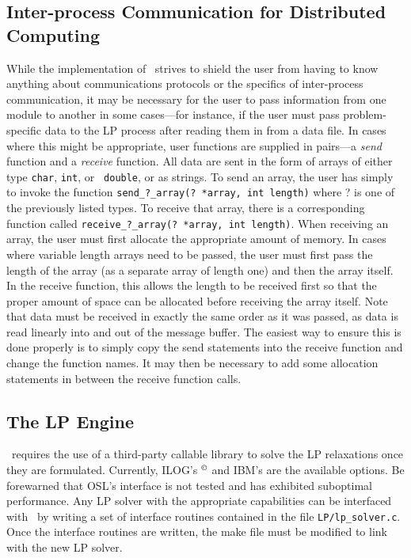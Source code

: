 \subsection{Inter-process Communication for Distributed Computing}
\label{communication}
While the implementation of \BB\ strives to shield the user from
having to know anything about communications protocols or the
specifics of inter-process communication, it may be necessary for the
user to pass information from one module to another in some
cases---for instance, if the user must pass problem-specific data to
the LP process after reading them in from a data file. In cases where
this might be appropriate, user functions are supplied in pairs---a
{\em send} function and a {\em receive} function. All data are sent in
the form of arrays of either type {\tt char}, {\tt int}, or {\tt
double}, or as strings. To send an array, the user has simply to
invoke the function {\tt send\_?\_array(? *array, int length)} where ?
is one of the previously listed types. To receive that array, there is
a corresponding function called {\tt receive\_?\_array(? *array, int
length)}. When receiving an array, the user must first
allocate the appropriate amount of memory. In cases where variable
length arrays need to be passed, the user must first pass the length
of the array (as a separate array of length one) and then the array
itself. In the receive function, this allows the length to be received
first so that the proper amount of space can be allocated before
receiving the array itself. Note that data must be received in exactly
the same order as it was passed, as data is read linearly into and out
of the message buffer. The easiest way to ensure this is done properly
is to simply copy the send statements into the receive function and
change the function names. It may then be necessary to add some
allocation statements in between the receive function calls.

\subsection{The LP Engine}

\BB\ requires the use of a third-party callable library to solve the LP 
relaxations once they are formulated. Currently, ILOG's
$^{\copyright}$
and IBM's
are the available options. Be forewarned that OSL's interface is not
tested and has exhibited suboptimal performance. Any LP solver with
the appropriate capabilities can be interfaced with \BB\ by writing a
set of interface routines contained in the file {\tt LP/lp\_solver.c}.
Once the interface routines are written, the make file must be
modified to link with the new LP solver.


